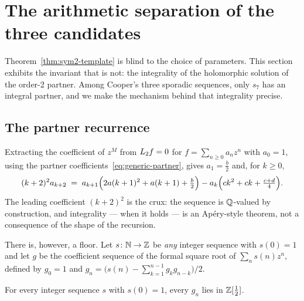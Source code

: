 \section{The arithmetic separation of the three candidates}
\label{sec:integrality}

Theorem~\ref{thm:sym2-template} is blind to the choice of parameters. This
section exhibits the invariant that is not: the integrality of the holomorphic
solution of the order-2 partner. Among Cooper's three sporadic sequences, only
$s_7$ has an integral partner, and we make the mechanism behind that
integrality precise.

\subsection{The partner recurrence}

Extracting the coefficient of $z^{M}$ from $L_2 f = 0$ for
$f = \sum_{n\geq0}a_nz^n$ with $a_0 = 1$, using the partner
coefficients~\eqref{eq:generic-partner}, gives $a_1 = \tfrac{b}{2}$ and, for
$k\geq0$,
\begin{equation}\label{eq:partner-recurrence}
  (k+2)^2 a_{k+2}
  \;=\; a_{k+1}\Bigl(2a(k+1)^2 + a(k+1) + \tfrac{b}{2}\Bigr)
      - a_k\Bigl(ck^2 + ck + \tfrac{c+d}{4}\Bigr).
\end{equation}
The leading coefficient $(k+2)^2$ is the crux: the sequence is
$\mathbb{Q}$-valued by construction, and integrality --- when it holds --- is an
Ap\'ery-style theorem, not a consequence of the shape of the recursion.

There is, however, a floor. Let $s\colon\mathbb{N}\to\mathbb{Z}$ be \emph{any} integer
sequence with $s(0)=1$ and let $g$ be the coefficient sequence of the formal
square root of $\sum_n s(n)z^n$, defined by $g_0=1$ and
$g_n = \bigl(s(n) - \sum_{k=1}^{n-1}g_kg_{n-k}\bigr)/2$.

\begin{proposition}\label{prop:dyadic}
For every integer sequence $s$ with $s(0)=1$, every $g_n$ lies in
$\mathbb{Z}[\tfrac12]$.
\end{proposition}

